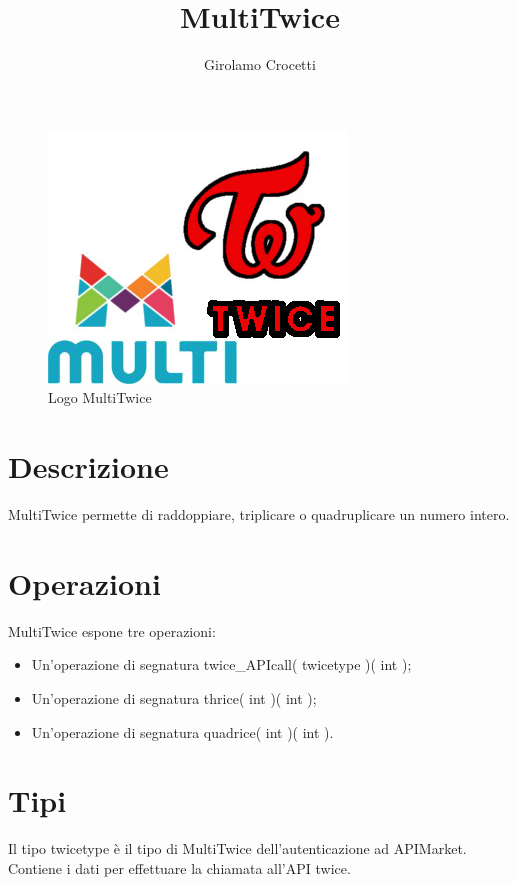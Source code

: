 \documentclass[a4paper]{article}
\title{MultiTwice}
\author{Girolamo Crocetti}
\begin{document}
\maketitle

\begin{figure}[H]
	\centering
	\includegraphics[width=0.3\linewidth]{MultiTwice.jpg}
	\caption{Logo MultiTwice}
\end{figure}

\section{Descrizione}

MultiTwice permette di raddoppiare, triplicare o quadruplicare un numero intero.

\section{Operazioni}

MultiTwice espone tre operazioni:
\begin{itemize}
	\item Un'operazione di segnatura twice\_APIcall( twicetype )( int );
	\item Un'operazione di segnatura thrice( int )( int );
	\item Un'operazione di segnatura quadrice( int )( int ).
\end{itemize}

\section{Tipi}

Il tipo twicetype è il tipo di MultiTwice dell'autenticazione ad APIMarket. Contiene i dati per effettuare la chiamata all'API twice.
\end{document}
